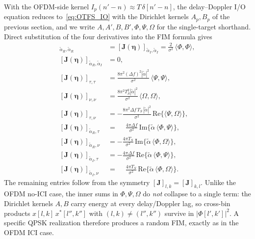 \documentclass[11pt]{article}
\begin{document}
With the OFDM-side kernel \(I_p(n'-n) \approx T\,\delta[n'-n]\), the
delay--Doppler I/O equation reduces to~\eqref{eq:OTFS_IO} with the
Dirichlet kernels \(A_p,B_p\) of the previous section, and we write
\(A,A',B,B',\Phi,\Psi,\Omega\) for the single-target shorthand.
Direct substitution of the four derivatives into the FIM formula gives
\begin{align}
    [\bm{J}(\bm{\eta})]_{\tilde{\alpha}_R, \tilde{\alpha}_R} &=
        [\bm{J}(\bm{\eta})]_{\tilde{\alpha}_I, \tilde{\alpha}_I} =
        \tfrac{2}{\sigma^2}\,\langle \Phi,\Phi\rangle, \\
    [\bm{J}(\bm{\eta})]_{\tilde{\alpha}_R, \tilde{\alpha}_I} &= 0, \\
    [\bm{J}(\bm{\eta})]_{\tau,\tau} &=
        \tfrac{8\pi^2 (\Delta f)^2 |\tilde{\alpha}|^2}{\sigma^2}\,
        \langle \Psi,\Psi\rangle, \\
    [\bm{J}(\bm{\eta})]_{\nu,\nu} &=
        \tfrac{8\pi^2 T_S^2 |\tilde{\alpha}|^2}{\sigma^2}\,
        \langle \Omega,\Omega\rangle, \\
    [\bm{J}(\bm{\eta})]_{\tau,\nu} &=
        -\tfrac{8\pi^2 \Delta f\, T_S\, |\tilde{\alpha}|^2}{\sigma^2}\,
        \text{Re}\{\langle \Psi,\Omega\rangle\}, \\
    [\bm{J}(\bm{\eta})]_{\tilde{\alpha}_R, \tau} &=
        \phantom{-}\tfrac{4\pi\Delta f}{\sigma^2}\,
        \text{Im}\{ \tilde{\alpha}\,\langle \Phi,\Psi\rangle \}, \\
    [\bm{J}(\bm{\eta})]_{\tilde{\alpha}_R, \nu} &=
        -\tfrac{4\pi T_S}{\sigma^2}\,
        \text{Im}\{ \tilde{\alpha}\,\langle \Phi,\Omega\rangle \}, \\
    [\bm{J}(\bm{\eta})]_{\tilde{\alpha}_I, \tau} &=
        -\tfrac{4\pi\Delta f}{\sigma^2}\,
        \text{Re}\{ \tilde{\alpha}\,\langle \Phi,\Psi\rangle \}, \\
    [\bm{J}(\bm{\eta})]_{\tilde{\alpha}_I, \nu} &=
        \phantom{-}\tfrac{4\pi T_S}{\sigma^2}\,
        \text{Re}\{ \tilde{\alpha}\,\langle \Phi,\Omega\rangle \}.
\end{align}
The remaining entries follow from the symmetry \([\bm{J}]_{l,k} = [\bm{J}]_{k,l}\).
Unlike the OFDM no-ICI case, the inner sums in \(\Phi,\Psi,\Omega\) do
\emph{not} collapse to a single term: the Dirichlet kernels \(A,B\) carry
energy at every delay/Doppler lag, so cross-bin products
\(x[l,k]\,x^*[l'',k'']\) with \((l,k)\neq(l'',k'')\) survive in
\(|\Phi[l',k']|^2\). A specific QPSK realization therefore produces a random
FIM, exactly as in the OFDM ICI case.
\end{document}
